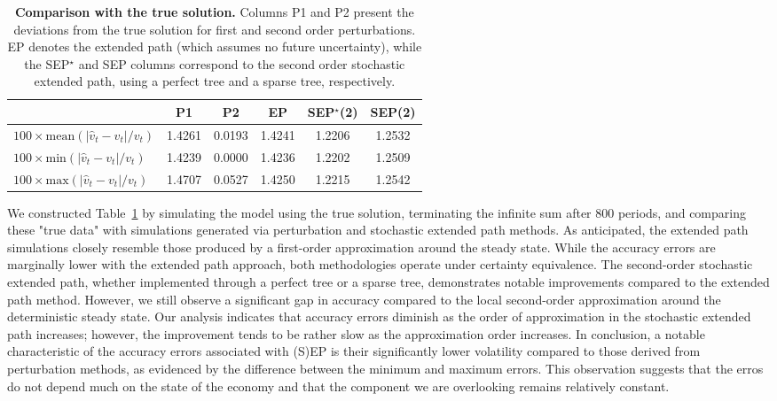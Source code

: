 \documentclass[a4paper,11pt]{amsart}
\begin{document}
\begin{table}[H]
   \centering
   \begin{tabular}{l | S[table-format=1.4] S[table-format=1.4] |  S[table-format=1.4]  | S[table-format=1.4] S[table-format=1.4]}
      \hline
                                                     & {P1}   & {P2}   & {EP}   & {SEP$^{\star}$(2)} & {SEP(2)} \\
      \hline\hline
      $100\times\textrm{mean}(|\hat v_t - v_t|/v_t)$ & 1.4261 & 0.0193 & 1.4241 & 1.2206             & 1.2532   \\
      $100\times\textrm{min}(|\hat v_t - v_t|/v_t)$  & 1.4239 & 0.0000 & 1.4236 & 1.2202             & 1.2509   \\
      $100\times\textrm{max}(|\hat v_t - v_t|/v_t)$  & 1.4707 & 0.0527 & 1.4250 & 1.2215             & 1.2542   \\
      \hline
   \end{tabular}
   \caption{\textbf{Comparison with the true solution.} Columns P1 and
      P2 present the deviations from the true solution for first and
      second order perturbations. EP denotes the extended path (which
      assumes no future uncertainty), while the SEP$^{\star}$ and SEP
      columns correspond to the second order stochastic extended path,
      using a perfect tree and a sparse tree, respectively.}
   \label{table:1}
\end{table}


We constructed Table~\ref{table:1} by simulating the model using the
true solution, terminating the infinite sum after 800 periods, and
comparing these "true data" with simulations generated via
perturbation and stochastic extended path methods. As anticipated, the
extended path simulations closely resemble those produced by a
first-order approximation around the steady state. While the accuracy
errors are marginally lower with the extended path approach, both
methodologies operate under certainty equivalence. The second-order
stochastic extended path, whether implemented through a perfect tree
or a sparse tree, demonstrates notable improvements compared to the
extended path method. However, we still observe a significant gap in
accuracy compared to the local second-order approximation around the
deterministic steady state. Our analysis indicates that accuracy
errors diminish as the order of approximation in the stochastic
extended path increases; however, the improvement tends to be rather
slow as the approximation order increases. In conclusion, a notable
characteristic of the accuracy errors associated with (S)EP is their
significantly lower volatility compared to those derived from
perturbation methods, as evidenced by the difference between the
minimum and maximum errors. This observation suggests that the erros
do not depend much on the state of the economy and that the component
we are overlooking remains relatively constant.\newline
\end{document}
